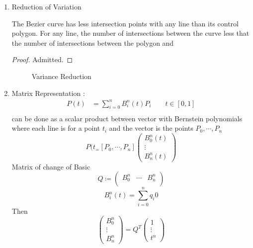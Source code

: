 \begin{enumerate}[label={(\alph*)}]
    \item Reduction of Variation
        \begin{prop}[]
            The Bezier curve has less intersection points with any line than its control
            polygon. 
            For any line, the number of intersections between the curve 
            less that the number of intersections between the polygon and 
        \end{prop}
        \begin{proof}
            Admitted. 
        \end{proof}
\begin{figure}[ht]
    \centering
    \caption{Variance Reduction}
    \label{fig:variance-reduction}
\end{figure}
    \item Matrix Representation : 
        \begin{align*}
            P(t) &= \sum_{i=0}^{n} B _{ i }^{ n  } (t) P_i  \qquad t\in [0,1]\\
        \end{align*}
        can be done as a scalar product between vector with Bernstein polynomials where
        each line is for a point $ t_i $ and the vector is the points $ P_0, \cdots, P_n $
        \[
            P(t_ = [P_0, \cdots, P_n] \begin{pmatrix*}
                B _{ 0 }^{ n  } (t) \\
                \vdots \\
                B _{ n  }^{ n  } (t) 
            \end{pmatrix*}
        \]
        Matrix of change of Basic 
        \[
        Q\coloneqq \begin{pmatrix*}
            B _{ 0 }^{ n  }& \cdots& B _{ n  }^{ n  }  \\
              \
        \end{pmatrix*}
        
        \]
        \[
            B _{ i }^{ n  } (t) = \sum_{i=0}^{n} q_i0
        \]
        Then 
        \[
        \begin{pmatrix*}
            B _{ 0 }^{ n  }   \\
            \vdots \\
            B _{ n  }^{ n  } 
        \end{pmatrix*}
        = Q^T \begin{pmatrix*}
            1  \\
            \vdots \\
            t^n
        \end{pmatrix*}
        
\]
\end{enumerate}
